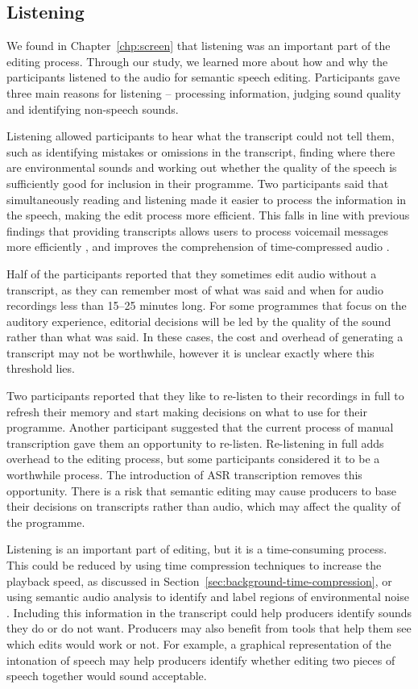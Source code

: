 \subsection{Listening}

We found in Chapter~\ref{chp:screen} that listening was an important part of the editing process. Through our study, we
learned more about how and why the participants listened to the audio for semantic speech editing.  Participants gave
three main reasons for listening -- processing information, judging sound quality and identifying non-speech sounds.

Listening allowed participants to hear what the transcript could not tell them, such as identifying mistakes or
omissions in the transcript, finding where there are environmental sounds and working out whether the quality of the
speech is sufficiently good for inclusion in their programme.  Two participants said that simultaneously reading and
listening made it easier to process the information in the speech, making the edit process more efficient. This falls
in line with previous findings that providing transcripts allows users to process voicemail messages more efficiently
\citep{Whittaker2002}, and improves the comprehension of time-compressed audio \citep{Vemuri2004}.

Half of the participants reported that they sometimes edit audio without a transcript, as they can remember most of
what was said and when for audio recordings less than 15--25 minutes long.  For some programmes that focus on
the auditory experience, editorial decisions will be led by the quality of the sound rather than what was said. In
these cases, the cost and overhead of generating a transcript may not be worthwhile, however it is unclear exactly
where this threshold lies.

Two participants reported that they like to re-listen to their recordings in full to refresh their memory and start
making decisions on what to use for their programme.  Another participant suggested that the current process of manual
transcription gave them an opportunity to re-listen.  Re-listening in full adds overhead to the editing process, but
some participants considered it to be a worthwhile process.  The introduction of ASR transcription removes this
opportunity. There is a risk that semantic editing may cause producers to base their decisions on transcripts rather
than audio, which may affect the quality of the programme.

Listening is an important part of editing, but it is a time-consuming process. This could be reduced by using time
compression techniques to increase the playback speed, as discussed in Section~\ref{sec:background-time-compression},
or using semantic audio analysis to identify and label regions of environmental noise \citep{Duan2014}. Including this
information in the transcript could help producers identify sounds they do or do not want.  Producers may also
benefit from tools that help them see which edits would work or not.  For example, a graphical representation of the
intonation of speech may help producers identify whether editing two pieces of speech together would sound acceptable.

